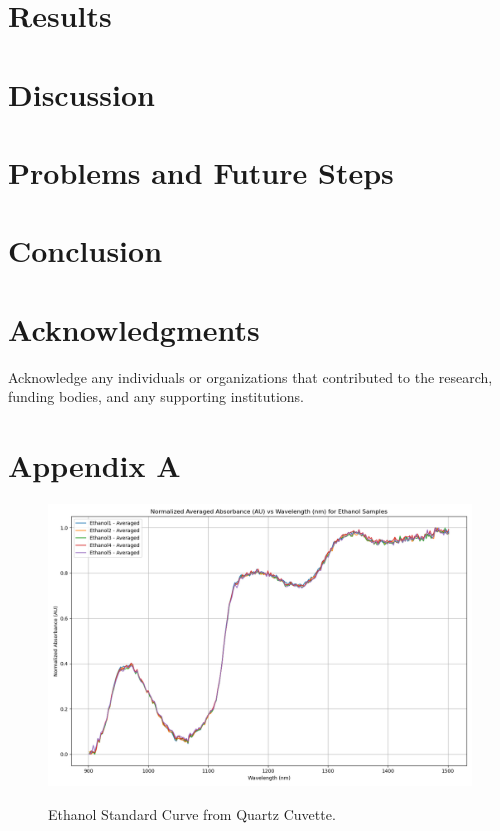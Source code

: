 \documentclass[final, 3p, 11pt]{elsarticle}
\begin{document}
\section{Results}

\section{Discussion}

\section{Problems and Future Steps}

\section{Conclusion}


\section*{Acknowledgments}
Acknowledge any individuals or organizations that contributed to the research, funding bodies, and any supporting institutions.

\newpage

\newpage

\section*{Appendix A}

\renewcommand{\thefigure}{A.\arabic{figure}}
\setcounter{figure}{0}  %

\begin{figure}[H]
    \captionsetup{justification=raggedright, singlelinecheck=false, position=above}  %
    \caption{Ethanol Standard Curve from Quartz Cuvette.}
    \centering
    \includegraphics[width=\textwidth]{Images/Ethanol_Standard.png}
    \label{fig:appendix_ethanol_standard}
\end{figure}
\end{document}
